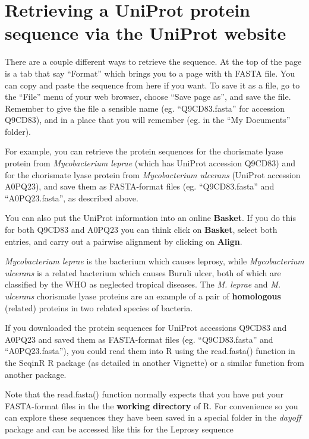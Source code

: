 \documentclass[
]{book}
\begin{document}
\hypertarget{retrieving-a-uniprot-protein-sequence-via-the-uniprot-website}{%
\section{Retrieving a UniProt protein sequence via the UniProt website}\label{retrieving-a-uniprot-protein-sequence-via-the-uniprot-website}}

There are a couple different ways to retrieve the sequence. At the top of the page is a tab that say ``Format'' which brings you to a page with th FASTA file. You can copy and paste the sequence from here if you want. To save it as a file, go to the ``File'' menu of your web browser, choose ``Save page as'', and save the file. Remember to give the file a sensible name (eg. ``Q9CD83.fasta'' for accession Q9CD83), and in a place that you will remember (eg. in the ``My Documents'' folder).

For example, you can retrieve the protein sequences for the chorismate lyase protein from \emph{Mycobacterium leprae} (which has UniProt accession Q9CD83) and for the chorismate lyase protein from \emph{Mycobacterium ulcerans} (UniProt accession A0PQ23), and save them as FASTA-format files (eg. ``Q9CD83.fasta'' and ``A0PQ23.fasta'', as described above.

You can also put the UniProt information into an online \textbf{Basket}. If you do this for both Q9CD83 and A0PQ23 you can think click on \textbf{Basket}, select both entries, and carry out a pairwise alignment by clicking on \textbf{Align}.

\emph{Mycobacterium leprae} is the bacterium which causes leprosy, while \emph{Mycobacterium ulcerans} is a related bacterium which causes Buruli ulcer, both of which are classified by the WHO as neglected tropical diseases. The \emph{M. leprae} and \emph{M. ulcerans} chorismate lyase proteins are an example of a pair of \textbf{homologous} (related) proteins in two related species of bacteria.

If you downloaded the protein sequences for UniProt accessions Q9CD83 and A0PQ23 and saved them as FASTA-format files (eg. ``Q9CD83.fasta'' and ``A0PQ23.fasta''), you could read them into R using the read.fasta() function in the SeqinR R package (as detailed in another Vignette) or a similar function from another package.

Note that the read.fasta() function normally expects that you have put your FASTA-format files in the the \textbf{working directory} of R. For convenience so you can explore these sequences they have been saved in a special folder in the \emph{dayoff} package and can be accessed like this for the Leprosy sequence
\end{document}
